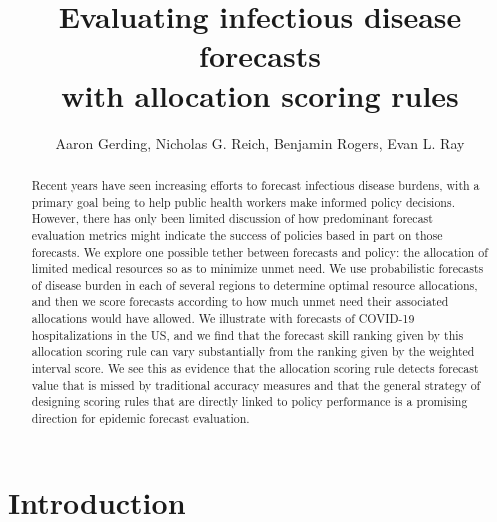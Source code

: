 \documentclass{article}\usepackage[]{graphicx}\usepackage[]{xcolor}
\title{Evaluating infectious disease forecasts \\ with allocation scoring rules}
\author{Aaron Gerding, Nicholas G. Reich, Benjamin Rogers, Evan L. Ray}
\begin{document}
\newcommand{\del}[2]{\frac{\partial {#1} }{\partial {#2}} }
\newcommand{\dby}[2]{\frac{d {#1} }{d {#2}} }
\newcommand{\sbar}{\overline{s}}
\newtheorem{proposition}{Proposition}

\theoremstyle{remark}
\newtheorem*{remark}{Remark}

\maketitle







\begin{abstract}

Recent years have seen increasing efforts to forecast infectious disease burdens, with a primary goal being to help public health workers make informed policy decisions. However, there has only been limited discussion of how predominant forecast evaluation metrics might indicate the success of policies based in part on those forecasts. We explore one possible tether between forecasts and policy: the allocation of limited medical resources so as to minimize unmet need. We use probabilistic forecasts of disease burden in each of several regions to determine optimal resource allocations, and then we score forecasts according to how much unmet need their associated allocations would have allowed. We illustrate with forecasts of COVID-19 hospitalizations in the US, and we find that the forecast skill ranking given by this allocation scoring rule can vary substantially from the ranking given by the weighted interval score. We see this as evidence that the allocation scoring rule detects forecast value that is missed by traditional accuracy measures and that the general strategy of designing scoring rules that are directly linked to policy performance is a promising direction for epidemic forecast evaluation.

\end{abstract}

\section{Introduction}
\end{document}
